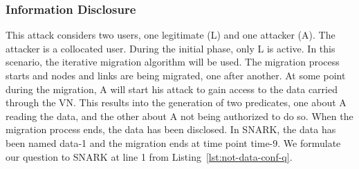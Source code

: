 \subsubsection{Information Disclosure}
This attack considers two users, one legitimate (L) and one attacker (A).
The attacker is a collocated user.
During the initial phase, only L is active.
In this scenario, the iterative migration algorithm will be used.
The migration process starts and nodes and links are being migrated, one after another.
At some point during the migration, A will start his attack to gain access to the data carried through the VN.
This results into the generation of two predicates, one about A reading the data, and the other about A not being authorized to do so. 
When the migration process ends, the data has been disclosed.
In SNARK, the data has been named data-1 and the migration ends at time point time-9.
We formulate our question to SNARK at line 1 from Listing~\ref{lst:not-data-conf-q}.

